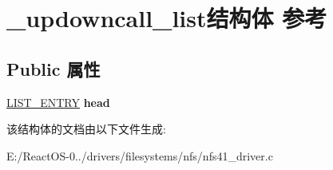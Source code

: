 \hypertarget{struct__updowncall__list}{}\section{\+\_\+updowncall\+\_\+list结构体 参考}
\label{struct__updowncall__list}
\subsection*{Public 属性}
\begin{DoxyCompactItemize}
\item 
\mbox{\label{struct__updowncall__list_a46283b0dc97e87318da30e05962aa412}} 
\hyperlink{struct___l_i_s_t___e_n_t_r_y}{L\+I\+S\+T\+\_\+\+E\+N\+T\+RY} {\bfseries head}
\end{DoxyCompactItemize}


该结构体的文档由以下文件生成\+:\begin{DoxyCompactItemize}
\item 
E\+:/\+React\+O\+S-\/0../drivers/filesystems/nfs/nfs41\+\_\+driver.\+c\end{DoxyCompactItemize}
